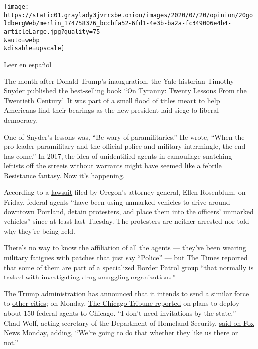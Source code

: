 \texttt{[image: https://static01.graylady3jvrrxbe.onion/images/2020/07/20/opinion/20goldbergWeb/merlin\_174758376\_bccbfa52-6fd1-4e3b-ba2a-fc349006e4b4-articleLarge.jpg?quality=75\\\&auto=webp\\\&disable=upscale]}

\href{https://www.nytimes3xbfgragh.onion/es/2020/07/22/espanol/opinion/portland-protestas-trump.html}{Leer
en español}

The month after Donald Trump's inauguration, the Yale historian Timothy
Snyder published the best-selling book ``On Tyranny: Twenty Lessons From
the Twentieth Century.'' It was part of a small flood of titles meant to
help Americans find their bearings as the new president laid siege to
liberal democracy.

One of Snyder's lessons was, ``Be wary of paramilitaries.'' He wrote,
``When the pro-leader paramilitary and the official police and military
intermingle, the end has come.'' In 2017, the idea of unidentified
agents in camouflage snatching leftists off the streets without warrants
might have seemed like a febrile Resistance fantasy. Now it's happening.

According to a
\href{http://opb-imgserve-production.s3-website-us-west-2.amazonaws.com/original/ag_rosenblum_xxxx_updated_complaint_1595086491349.pdf}{lawsuit}
filed by Oregon's attorney general, Ellen Rosenblum, on Friday, federal
agents ``have been using unmarked vehicles to drive around downtown
Portland, detain protesters, and place them into the officers' unmarked
vehicles'' since at least last Tuesday. The protesters are neither
arrested nor told why they're being held.

There's no way to know the affiliation of all the agents --- they've
been wearing military fatigues with patches that just say ``Police'' ---
but The Times reported that some of them are
\href{https://www.nytimes3xbfgragh.onion/2020/07/18/us/portland-protests.html}{part
of a specialized Border Patrol group} ``that normally is tasked with
investigating drug smuggling organizations.''

The Trump administration has announced that it intends to send a similar
force to
\href{https://www.motherjones.com/anti-racism-police-protest/2020/07/trump-border-patrol-cities-portland-chicago/}{other
cities}; on Monday,
\href{https://www.chicagotribune.com/news/criminal-justice/ct-chicago-police-dhs-deployment-20200720-dftu5ychwbcxtg4ltarh5qnwma-story.html}{The
Chicago Tribune reported} on plans to deploy about 150 federal agents to
Chicago. ``I don't need invitations by the state,'' Chad Wolf, acting
secretary of the Department of Homeland Security,
\href{https://twitter.com/atrupar/status/1285224329878306817?s=20}{said
on Fox News} Monday, adding, ``We're going to do that whether they like
us there or not.''

